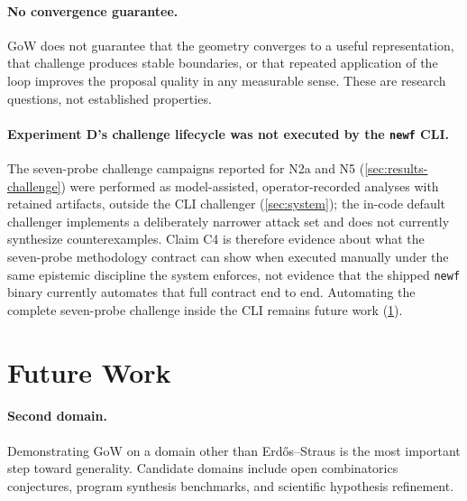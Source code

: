 \documentclass[11pt]{article}
\theoremstyle{gowthm}
\theoremstyle{gowplain}
\begin{document}
\paragraph{No convergence guarantee.}
GoW does not guarantee that the geometry converges to a useful representation,
that challenge produces stable boundaries, or that repeated application of the
loop improves the proposal quality in any measurable sense. These are research
questions, not established properties.

\paragraph{Experiment D's challenge lifecycle was not executed by the \texttt{newf} CLI.}
The seven-probe challenge campaigns reported for N2a and N5
(\cref{sec:results-challenge}) were performed as model-assisted,
operator-recorded analyses with retained artifacts, outside the CLI
challenger (\cref{sec:system}); the in-code default challenger implements a
deliberately narrower attack set and does not currently synthesize
counterexamples. Claim C4 is therefore evidence about what the seven-probe
methodology contract can show when executed manually under the same
epistemic discipline the system enforces, not evidence that the shipped
\texttt{newf} binary currently automates that full contract end to end.
Automating the complete seven-probe challenge inside the CLI remains future
work (\cref{sec:future}).

\section{Future Work}
\label{sec:future}

\paragraph{Second domain.}
Demonstrating GoW on a domain other than Erd\H{o}s--Straus is the most
important step toward generality. Candidate domains include open combinatorics
conjectures, program synthesis benchmarks, and scientific hypothesis refinement.
\end{document}
